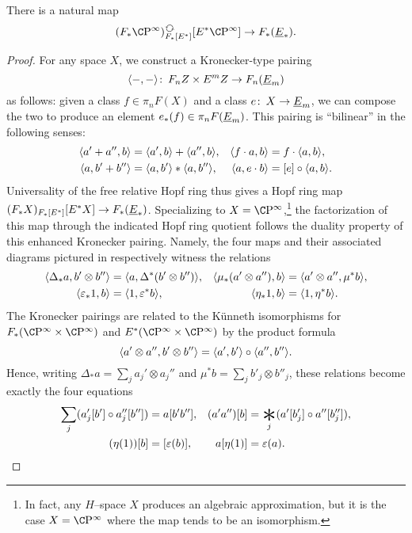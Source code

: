 \begin{lemma}\label{HopfRingComparisonMap}
There is a natural map \[(F_* \CP^\infty)_{F_*[E^*]}^{\circulatearrows}[E^* \CP^\infty] \to F_*(\OS{E}{*}).\]
\end{lemma}
\begin{proof}
For any space \(X\), we construct a Kronecker-type pairing \[\langle-,-\rangle\colon\thinspace F_n Z \times E^m Z \to F_n(\underline{\smash{E}}_{m})\] as follows: given a class \(f \in \pi_n F(X)\) and a class \(e\colon\thinspace X \to \underline{\smash{E}}_{m}\), we can compose the two to produce an element \(e_*(f) \in \pi_n F(\underline{\smash{E}}_{m})\).  This pairing is ``bilinear'' in the following senses:
\begin{align*}
\langle a' + a'', b\rangle & = \langle a', b\rangle + \langle a'', b\rangle, &
\langle f \cdot a, b\rangle & = f \cdot \langle a, b\rangle, \\
\langle a, b' + b''\rangle & = \langle a, b'\rangle \ast \langle a, b''\rangle, &
\langle a, e \cdot b\rangle & = [e] \circ \langle a, b\rangle.
\end{align*}
Universality of the free relative Hopf ring thus gives a Hopf ring map \((F_* X)_{F_*[E^*]}[E^* X] \to F_*(\underline{\smash{E}}_{*})\).  Specializing to \(X = \CP^\infty\),\footnote{In fact, any $H$--space $X$ produces an algebraic approximation, but it is the case $X = \CP^\infty$ where the map tends to be an isomorphism.} the factorization of this map through the indicated Hopf ring quotient follows the duality property of this enhanced Kronecker pairing.  Namely, the four maps and their associated diagrams pictured in  respectively witness the relations
\begin{align*}
\langle\Delta_* a, b' \otimes b''\rangle & = \langle a, \Delta^*(b' \otimes b'')\rangle, &
\langle\mu_*(a' \otimes a''), b\rangle & = \langle a' \otimes a'', \mu^* b\rangle, \\
\langle\varepsilon_* 1, b\rangle & = \langle1, \varepsilon^* b\rangle, &
\langle\eta_* 1, b\rangle & = \langle1, \eta^* b\rangle.
\end{align*}
The Kronecker pairings are related to the K\"unneth isomorphisms for \(F_*(\CP^\infty \times \CP^\infty)\) and \(E^*(\CP^\infty \times \CP^\infty)\) by the product formula \[\langle a' \otimes a'', b' \otimes b''\rangle = \langle a', b'\rangle \circ \langle a'', b''\rangle.\]  Hence, writing \(\Delta_* a = \sum_j a_j' \otimes a_j''\) and \(\mu^* b = \sum_j b'_j \otimes b''_j\), these relations become exactly the four equations
\begin{align*}
\sum_j (a'_j[b'] \circ a''_j[b'']) & = a[b'b''], &
(a' a'')[b] & = \bigast_j (a'[b'_j] \circ a''[b''_j]), \\
(\eta(1))[b] & = [\eps(b)], &
a[\eta(1)] & = \eps(a).
\qedhere
\end{align*}
\end{proof}

